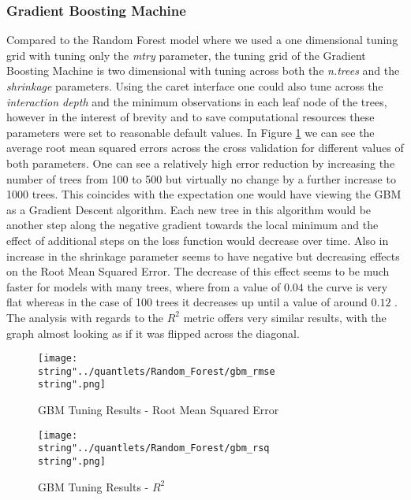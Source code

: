 \subsubsection{Gradient Boosting Machine}
Compared to the Random Forest model where we used a one dimensional tuning grid with tuning only the \textit{mtry} parameter, the tuning grid of the Gradient Boosting Machine is two dimensional with tuning across both the \textit{n.trees} and the \textit{shrinkage} parameters.
Using the caret interface one could also tune across the \textit{interaction depth} and the minimum observations in each leaf node of the trees, however in the interest of brevity and to save computational resources these parameters were set to reasonable default values. 
In Figure \ref{fig:gmb_rmse} we can see the average root mean squared errors across the cross validation for different values of both parameters. One can see a relatively high error reduction by increasing the number of trees from 100 to 500 but virtually no change by a further increase to 1000 trees. This coincides with the expectation one would have viewing the GBM as a Gradient Descent algorithm. Each new tree in this algorithm would be another step along the negative gradient towards the local minimum and the effect of additional steps on the loss function would decrease over time. Also in increase in the shrinkage parameter seems to have negative but decreasing effects on the Root Mean Squared Error. The decrease of this effect seems to be much faster for models with many trees, where from a value of $0.04$ the curve is very flat whereas in the case of 100 trees it decreases up until a value of around $0.12$ . The analysis with regards to the $R^2$ metric offers very similar results, with the graph almost looking as if it was flipped across the diagonal. 


\begin{figure}
  \centering
\texttt{[image: \\string"../quantlets/Random\_Forest/gbm\_rmse\\string".png]}
  \caption{GBM Tuning Results - Root Mean Squared Error}\label{fig:gmb_rmse}
\end{figure}

\begin{figure}
  \centering
\texttt{[image: \\string"../quantlets/Random\_Forest/gbm\_rsq\\string".png]}
  \caption{GBM Tuning Results - $R^2$}\label{fig:gbm_rsq}
\end{figure}